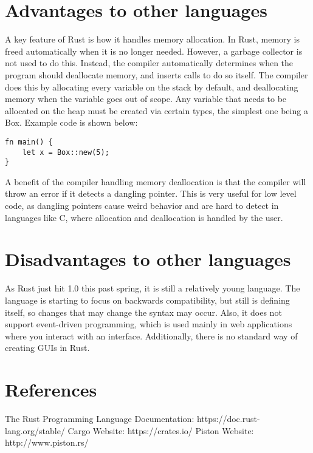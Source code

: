 \documentclass{article}
\begin{document}
\section{Advantages to other languages}
A key feature of Rust is how it handles memory allocation. In Rust, memory is freed automatically when it is no longer needed. However, a garbage collector is not used to do this. Instead, the compiler automatically determines when the program should deallocate memory, and inserts calls to do so itself. The compiler does this by allocating every variable on the stack by default, and deallocating memory when the variable goes out of scope. Any variable that needs to be allocated on the heap must be created via certain types, the simplest one being a Box. Example code is shown below:
\begin{lstlisting}
fn main() {
	let x = Box::new(5);
}
\end{lstlisting}
A benefit of the compiler handling memory deallocation is that the compiler will throw an error if it detects a dangling pointer. This is very useful for low level code, as dangling pointers cause weird behavior and are hard to detect in languages like C, where allocation and deallocation is handled by the user.

\section{Disadvantages to other languages}
As Rust just hit 1.0 this past spring, it is still a relatively young language. The language is starting to focus on backwards compatibility, but still is defining itself, so changes that may change the syntax may occur. Also, it does not support event-driven programming, which is used mainly in web applications where you interact with an interface. Additionally, there is no standard way of creating GUIs in Rust.

\section{References}
The Rust Programming Language Documentation: https://doc.rust-lang.org/stable/ \newline
Cargo Website: https://crates.io/ \newline
Piston Website: http://www.piston.rs/
\end{document}
